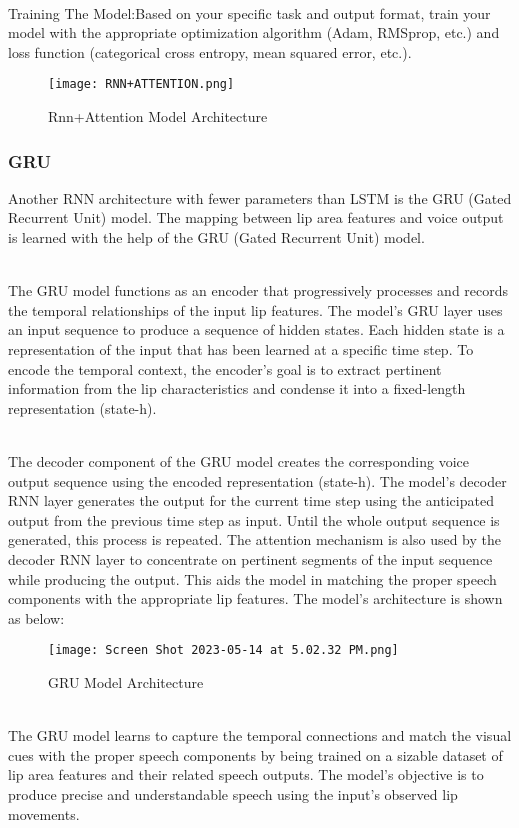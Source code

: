 \documentclass[conference]{IEEEtran}
\begin{document}
\\ Training The Model:Based on your specific task and output format, train your model with the appropriate optimization algorithm (Adam, RMSprop, etc.) and loss function (categorical cross entropy, mean squared error, etc.). 

\begin{figure}[htbp]
\centerline{\texttt{[image: RNN+ATTENTION.png]}}
\caption{Rnn+Attention Model Architecture}
\label{fig}
\end{figure}

\subsubsection{GRU}
Another RNN architecture with fewer parameters than LSTM is the GRU (Gated Recurrent Unit) model. The mapping between lip area features and voice output is learned with the help of the GRU (Gated Recurrent Unit) model.

\\ The GRU model functions as an encoder that progressively processes and records the temporal relationships of the input lip features. The model's GRU layer uses an input sequence to produce a sequence of hidden states. Each hidden state is a representation of the input that has been learned at a specific time step. To encode the temporal context, the encoder's goal is to extract pertinent information from the lip characteristics and condense it into a fixed-length representation (state-h).

\\ The decoder component of the GRU model creates the corresponding voice output sequence using the encoded representation (state-h). The model's decoder RNN layer generates the output for the current time step using the anticipated output from the previous time step as input. Until the whole output sequence is generated, this process is repeated. The attention mechanism is also used by the decoder RNN layer to concentrate on pertinent segments of the input sequence while producing the output. This aids the model in matching the proper speech components with the appropriate lip features. The model's architecture is shown as below:
\begin{figure}[htbp]
\centerline{\texttt{[image: Screen Shot 2023-05-14 at 5.02.32 PM.png]}}
\caption{GRU Model Architecture}
\label{fig}
\end{figure}
\\ The GRU model learns to capture the temporal connections and match the visual cues with the proper speech components by being trained on a sizable dataset of lip area features and their related speech outputs. The model's objective is to produce precise and understandable speech using the input's observed lip movements.
\end{document}

